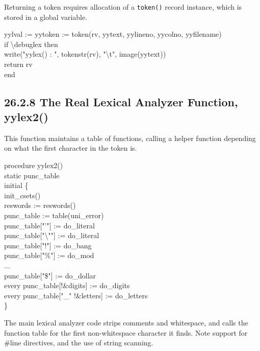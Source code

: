 Returning a token requires allocation of a \texttt{token()} record
instance, which is stored in a global variable.

\begin{iconcode}
\>   yylval := yytoken := token(rv, yytext, yylineno, yycolno, yyfilename) \\
\>   if {\textbackslash}debuglex then \\
\> \>     write("yylex() : ", tokenstr(rv), "{\textbackslash}t", image(yytext))\\
\>   return rv \\
end
\end{iconcode}

\subsection[26.2.8 The Real Lexical Analyzer Function, yylex2()]{26.2.8 The Real Lexical Analyzer Function, yylex2()}

This function maintains a table of functions, calling a helper
function depending on what the first character in the token is.

\begin{iconcode}
procedure yylex2() \\
static punc\_table \\
initial \{ \\
\>   init\_csets() \\
\>   reswords := reswords() \\
\>   punc\_table := table(uni\_error) \\
\>   punc\_table["'"] := do\_literal \\
\>   punc\_table["{\textbackslash}""] := do\_literal \\
\>   punc\_table["!"] := do\_bang \\
\>   punc\_table["\%"] := do\_mod \\
\>   ... \\
\>   punc\_table["\$"] := do\_dollar \\
\>   every punc\_table[!\&digits] := do\_digits \\
\>   every punc\_table["\_" {\textbar} !\&letters] := do\_letters \\
\>   \}
\end{iconcode}


The main lexical analyzer code strips comments and whitespace, and calls the function table for the first non-whitespace
character it finds. Note support for \#line directives, and the use of string scanning. 

